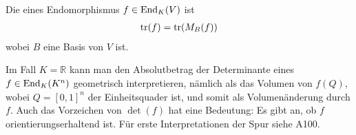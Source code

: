 \begin{definition}
	Die  eines Endomorphismus $f\in \operatorname{End}_K(V)$ ist
	\begin{align}
		\operatorname{tr}(f)=\operatorname{tr}(M_B(f))\notag
	\end{align} 
	wobei $B$ eine Basis von $V$ ist.
\end{definition}

\begin{remark}
	Im Fall $K=\mathbb R$ kann man den Absolutbetrag der Determinante eines $f\in \operatorname{End}_K(K^n)$ 
	geometrisch interpretieren, nämlich als das Volumen von $f(Q)$, wobei $Q=[0,1]^n$ der Einheitsquader ist, und somit 
	als Volumenänderung durch $f$. Auch das Vorzeichen von $\det(f)$ hat eine Bedeutung: Es gibt an, ob $f$ 
	orientierungserhaltend ist. Für erste Interpretationen der Spur siehe A100.
\end{remark}